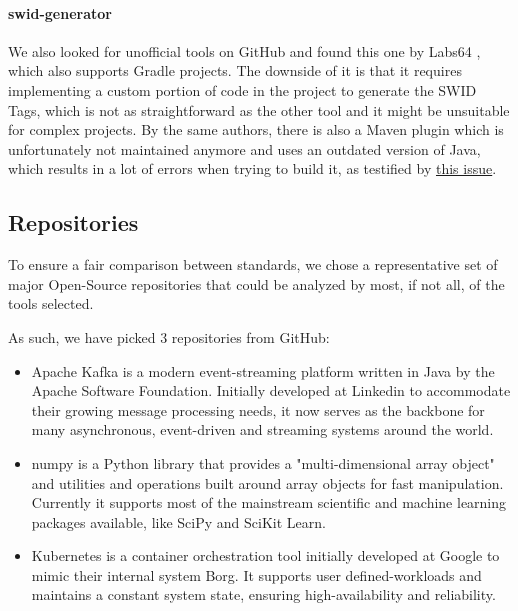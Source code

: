 \paragraph{swid-generator} We also looked for unofficial tools on GitHub and found this one by Labs64 \cite{repo:swid-generator}, which also supports Gradle projects. The downside of it is that it requires implementing a custom portion of code in the project to generate the SWID Tags, which is not as straightforward as the other tool and it might be unsuitable for complex projects. By the same authors, there is also a Maven plugin which is unfortunately not maintained anymore and uses an outdated version of Java, which results in a lot of errors when trying to build it, as testified by \href{https://github.com/Labs64/swid-maven-plugin/issues/5}{this issue}.






\subsection{Repositories} \label{methodology:repositories}

To ensure a fair comparison between standards, we chose a representative set of major Open-Source repositories that could be analyzed by most, if not all, of the tools selected.

As such, we have picked 3 repositories from GitHub:

\begin{itemize}
    \item Apache Kafka \cite{repository:dataset:kafka} is a modern event-streaming platform written in Java by the Apache Software Foundation. Initially developed at Linkedin to accommodate their growing message processing needs, it now serves as the backbone for many asynchronous, event-driven and streaming systems around the world.
    \item numpy \cite{repository:dataset:numpy} is a Python library that provides a "multi-dimensional array object" and utilities and operations built around array objects for fast manipulation. Currently it supports most of the mainstream scientific and machine learning packages available, like SciPy and SciKit Learn.
    \item Kubernetes \cite{repository:dataset:k8s} is a container orchestration tool initially developed at Google to mimic their internal system Borg. It supports user defined-workloads and maintains a constant system state, ensuring high-availability and reliability.
\end{itemize}